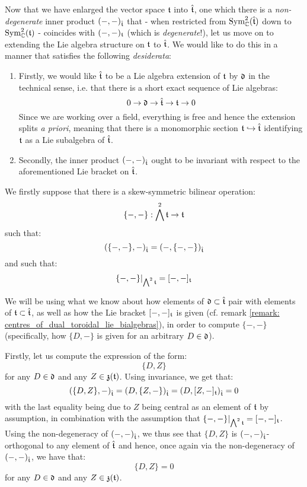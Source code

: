             \begin{remark} \label{remark: extending_toroidal_lie_algebra_structures}
                Now that we have enlarged the vector space $\mathfrak{t}$ into $\hat{\mathfrak{t}}$, one which there is a \textit{non-degenerate} inner product $(-, -)_{\hat{\mathfrak{t}}}$ that - when restricted from $\mathrm{Sym}^2_{\mathbb{C}}(\hat{\mathfrak{t}})$ down to $\mathrm{Sym}^2_{\mathbb{C}}(\mathfrak{t})$ - coincides with $(-, -)_{\mathfrak{t}}$ (which is \textit{degenerate}!), let us move on to extending the Lie algebra structure on $\mathfrak{t}$ to $\hat{\mathfrak{t}}$. We would like to do this in a manner that satisfies the following \textit{desiderata}:
                    \begin{enumerate}
                        \item Firstly, we would like $\hat{\mathfrak{t}}$ to be a Lie algebra extension of $\mathfrak{t}$ by $\mathfrak{d}$ in the technical sense, i.e. that there is a short exact sequence of Lie algebras:
                            $$0 \to \mathfrak{d} \to \hat{\mathfrak{t}} \to \mathfrak{t} \to 0$$
                        Since we are working over a field, everything is free and hence the extension splits \textit{a priori}, meaning that there is a monomorphic section $\mathfrak{t} \hookrightarrow \hat{\mathfrak{t}}$ identifying $\mathfrak{t}$ as a Lie subalgebra of $\hat{\mathfrak{t}}$.
                        \item Secondly, the inner product $(-, -)_{\hat{\mathfrak{t}}}$ ought to be invariant with respect to the aforementioned Lie bracket on $\hat{\mathfrak{t}}$.
                    \end{enumerate}

                We firstly suppose that there is a skew-symmetric bilinear operation:
                    $$\{-, -\}: \bigwedge^2 \mathfrak{t} \to \mathfrak{t}$$
                such that:
                    $$( \{-, -\}, - )_{\hat{\mathfrak{t}}} = ( -, \{-, -\} )_{\hat{\mathfrak{t}}}$$
                and such that:
                    $$\{-, -\}|_{\bigwedge^2 \mathfrak{t}} = [-, -]_{\mathfrak{t}}$$
                    
                We will be using what we know about how elements of $\mathfrak{d} \subset \hat{\mathfrak{t}}$ pair with elements of $\mathfrak{t} \subset \hat{\mathfrak{t}}$, as well as how the Lie bracket $[-, -]_{\mathfrak{t}}$ is given (cf. remark \ref{remark: centres_of_dual_toroidal_lie_bialgebras}), in order to compute $\{-, -\}$ (specifically, how $\{D, -\}$ is given for an arbitrary $D \in \mathfrak{d}$).

                Firstly, let us compute the expression of the form:
                    $$\{D, Z\}$$
                for any $D \in \mathfrak{d}$ and any $Z \in \mathfrak{z}(\mathfrak{t})$. Using invariance, we get that:
                    $$( \{D, Z\}, - )_{\hat{\mathfrak{t}}} = ( D, \{Z, -\} )_{\hat{\mathfrak{t}}} = ( D, [Z, -]_{\mathfrak{t}} )_{\hat{\mathfrak{t}}} = 0$$
                with the last equality being due to $Z$ being central as an element of $\mathfrak{t}$ by assumption, in combination with the assumption that $\{-, -\}|_{\bigwedge^2 \mathfrak{t}} = [-, -]_{\mathfrak{t}}$. Using the non-degeneracy of $(-, -)_{\hat{\mathfrak{t}}}$, we thus see that $\{D, Z\}$ is $(-, -)_{\hat{\mathfrak{t}}}$-orthogonal to any element of $\hat{\mathfrak{t}}$ and hence, once again via the non-degeneracy of $(-, -)_{\hat{\mathfrak{t}}}$, we have that:
                    $$\{D, Z\} = 0$$
                for any $D \in \mathfrak{d}$ and any $Z \in \mathfrak{z}(\mathfrak{t})$. 
                

\end{remark}
